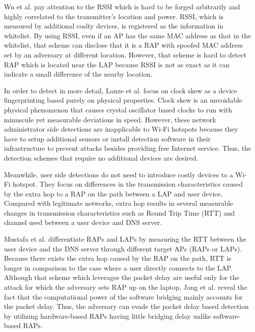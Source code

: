 \documentclass[conference]{IEEEtran}
\begin{document}
Wu et al. \cite{prapd} pay attention to the RSSI which is hard to be forged arbitrarily and highly correlated to the transmitter's location and power.
RSSI, which is measured by additional coslty devices, is registered as the information in whitelist.
By using RSSI, even if an AP has the same MAC address as that in the whitelist, that scheme can disclose that it is a RAP with spoofed MAC address set by an adversary at different location.
However, that scheme is hard to detect RAP which is located near the LAP because RSSI is not as exact as it can indicate a small difference of the nearby location. 

In order to detect in more detail, Lanze et al. \cite{clockskew} focus on clock skew as a device fingerprinting based purely on physical properties.
Clock skew is an unvoidable physical phenomenon that causes crystal oscillator based clocks to run with minuscule yet measurable deviations in speed.
However, these network administrator side detections are inapplicable to Wi-Fi hotspots because they have to setup additional sensors or install detection software in their infrastructure to prevent attacks besides providing free Internet service.
Thus, the detection schemes that require no additional devices are desired.

Meanwhile, user side detections do not need to introduce costly devices to a Wi-Fi hotspot. 
They focus on differences in the transmission characteristics caused by the extra hop to a RAP on the path between a LAP and user device. 
Compared with legitimate networks, extra hop results in several measurable changes in transmission characteristics such as Round Trip Time (RTT) and channel used between a user device and DNS server.

Mustafa et al. \cite{rtt} differentiate RAPs and LAPs by measuring the RTT between the user device and the DNS server through different target APs (RAPs or LAPs).
Because there exists the extra hop caused by the RAP on the path, RTT is longer in comparison to the case where a user directly connects to the LAP.
Although that scheme which leverages the packet delay are useful only for the attack for which the adversary sets RAP up on the laptop, Jang et al. \cite{previous} reveal the fact that the computational power of the software bridging mainly accounts for the packet delay.
Thus, the adversary can evade the packet delay based detection by utilizing hardware-based RAPs having little bridging delay unlike software-based RAPs.
\end{document}
